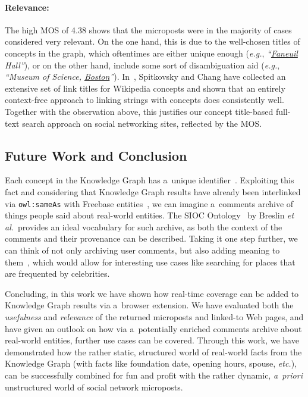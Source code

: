 \paragraph{Relevance:} \label{sec:relevance}
The high MOS of 4.38 shows that the microposts
were in the majority of cases considered very relevant.
On the one hand, this is due to the well-chosen titles of concepts in the graph,
which oftentimes are either unique enough (\emph{e.g.}, \emph{``\underline{Faneuil} Hall''}),
or on the other hand, include some sort of disambiguation aid
(\emph{e.g.}, \emph{``Museum of Science, \underline{Boston}''}).
In~\cite{spitkovsky2012}, Spitkovsky and Chang have collected
an extensive set of link titles for Wikipedia concepts
and shown that an entirely context-free approach
to linking strings with concepts does consistently well.
Together with the observation above, this justifies
our concept title-based full-text search approach on social networking sites,
reflected by the MOS.

\subsection{Future Work and Conclusion}
Each concept in the Knowledge Graph has a~unique identifier~\cite{thalhammer2012}.
Exploiting this fact and considering that Knowledge Graph results
have already been interlinked via \texttt{owl:sameAs}
with Freebase entities~\cite{glaser2012},
we can imagine a~comments archive of things people said about real-world entities.
The SIOC Ontology~\cite{breslin2005} by Breslin \emph{et al.}\
provides an ideal vocabulary for such archive,
as both the context of the comments and their provenance can be described.
Taking it one step further, we can think of not only archiving user comments,
but also adding meaning to them~\cite{steiner2013},
which would allow for interesting use cases
like searching for places that are frequented by celebrities.

Concluding, in this work we have shown how real-time coverage
can be added to Knowledge Graph results via a~browser extension.
We have evaluated both the \emph{usefulness} and \emph{relevance}
of the returned microposts and linked-to Web pages,
and have given an outlook on how via a~potentially enriched comments archive
about real-world entities, further use cases can be covered.
Through this work, we have demonstrated how the rather static, structured world
of real-world facts from the Knowledge Graph
(with facts like foundation date, opening hours, spouse, \emph{etc.}),
can be successfully combined for fun and profit
with the rather dynamic, \emph{a~priori} unstructured world
of social network microposts.


